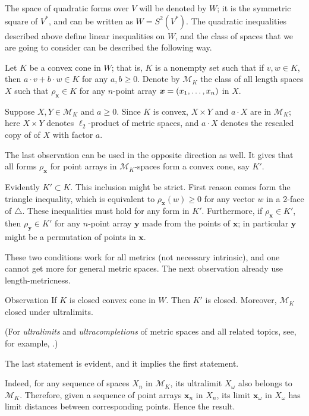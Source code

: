 \documentclass[a4paper,10pt]{article}
\begin{document}
The space of quadratic forms over $V$ will be denoted by $W$;
it is the symmetric square of $V^*$, and can be written as $W=S^2(V^*)$.
The quadratic inequalities described above define linear inequalities on $W$,
and the class of spaces that we are going to consider can be described the following way.

Let $K$ be a convex cone in $W$;
that is, $K$ is a nonempty set such that if $v,w\in K$, then $a\cdot v+b\cdot w\in K$ for any $a,b\ge0$.
Denote by $\mathcal{M}_K$ the class of all length spaces $X$ such that
$\rho_{\bm{x}}\in K$ for any $n$-point array $\bm{x}\z=(x_1,\dots,x_n)$ in $X$.

Suppose $X,Y\in  \mathcal{M}_K$ and $a\ge 0$.
Since $K$ is convex,  $X\times Y$ and $a\cdot X$ are in $\mathcal{M}_K$;
here $X\times Y$ denotes $\ell_2$-product of metric spaces, and 
$a\cdot X$ denotes the rescaled copy of of $X$ with factor $a$. 

The last observation can be used in the opposite direction as well.
It gives that all forms $\rho_{\bm{x}}$ for point arrays in $\mathcal{M}_K$-spaces form a convex cone, say $K'$.

Evidently $K'\subset K$.
This inclusion might be strict.
First reason comes form the triangle inequality, which is equivalent to $\rho_{\bm{x}}(w)\ge 0$ for any vector $w$ in a 2-face of $\triangle$.
These inequalities must hold for any form in $K'$.
Furthermore, if $\rho_{\bm{x}}\in K'$, then $\rho_{\bm{y}}\in K'$ for any $n$-point array $\bm{y}$ made from the points of $\bm{x}$; in particular $\bm{y}$ might be a permutation of points in $\bm{x}$.

These two conditions work for all metrics (not necessary intrinsic),
and one cannot get more for general metric spaces.
The next observation already use length-metricness.

\begin{thm}{Observation}
If $K$ is closed convex cone in $W$.
Then $K'$ is closed.
Moreover, $\mathcal{M}_K$ closed under ultralimits.
\end{thm}


(For \emph{ultralimits} and \emph{ultracompletions} of metric spaces and all related topics, see, for example, \cite{petrunin2023}.)

The last statement is evident, and it implies the first statement.

Indeed, for any sequence of spaces $X_n$ in $\mathcal{M}_K$, its ultralimit $X_\omega$ also belongs to $\mathcal{M}_K$.
Therefore, given a sequence of point arrays $\bm{x}_n$ in $X_n$,
its limit $\bm{x}_\omega$ in $X_\omega$ has limit distances between corresponding points.
Hence the result.
\qeds
\end{document}
